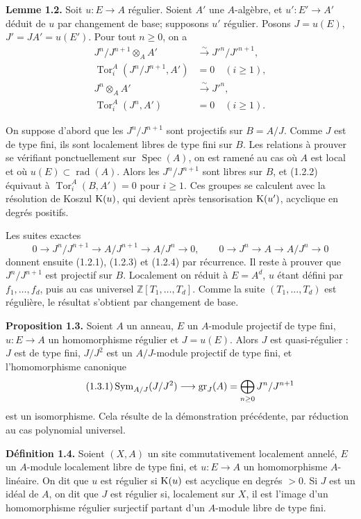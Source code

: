 \documentclass[11pt]{article}
\newcommand{\Tor}{\operatorname{Tor}}
\newcommand{\Spec}{\operatorname{Spec}}
\providecommand{\rad}{\operatorname{rad}}
\providecommand{\Tor}{\operatorname{Tor}}
\begin{document}
\textbf{Lemme 1.2.} Soit \(u:E\to A\) régulier. Soient \(A'\) une \(A\)-algèbre, et \(u':E'\to A'\) déduit de \(u\) par changement de base; supposons \(u'\) régulier. Posons \(J=u(E)\), \(J'=JA'=u(E')\). Pour tout \(n\ge0\), on a
\begin{align}
 J^n/J^{n+1}\otimes_AA'&\xrightarrow{\sim}J'^n/J'^{n+1}, \tag{1.2.1}\\
 \Tor_i^A(J^n/J^{n+1},A')&=0\quad(i\ge1), \tag{1.2.2}\\
 J^n\otimes_AA'&\xrightarrow{\sim}J'^n, \tag{1.2.3}\\
 \Tor_i^A(J^n,A')&=0\quad(i\ge1). \tag{1.2.4}
\end{align}

On suppose d'abord que les \(J^n/J^{n+1}\) sont projectifs sur \(B=A/J\). Comme \(J\) est de type fini, ils sont localement libres de type fini sur \(B\). Les relations à prouver se vérifiant ponctuellement sur \(\Spec(A)\), on est ramené au cas où \(A\) est local et où \(u(E)\subset\rad(A)\). Alors les \(J^n/J^{n+1}\) sont libres sur \(B\), et (1.2.2) équivaut à \(\Tor_i^A(B,A')=0\) pour \(i\ge1\). Ces groupes se calculent avec la résolution de Koszul \(\mathrm K(u)\), qui devient après tensorisation \(\mathrm K(u')\), acyclique en degrés positifs.

Les suites exactes
\[
0\to J^n/J^{n+1}\to A/J^{n+1}\to A/J^n\to0,
\qquad
0\to J^n\to A\to A/J^n\to0
\]
donnent ensuite (1.2.1), (1.2.3) et (1.2.4) par récurrence. Il reste à prouver que \(J^n/J^{n+1}\) est projectif sur \(B\). Localement on réduit à \(E=A^d\), \(u\) étant défini par \(f_1,\ldots,f_d\), puis au cas universel \(\mathbb Z[T_1,\ldots,T_d]\). Comme la suite \((T_1,\ldots,T_d)\) est régulière, le résultat s'obtient par changement de base.

\textbf{Proposition 1.3.} Soient \(A\) un anneau, \(E\) un \(A\)-module projectif de type fini, \(u:E\to A\) un homomorphisme régulier et \(J=u(E)\). Alors \(J\) est quasi-régulier : \(J\) est de type fini, \(J/J^2\) est un \(A/J\)-module projectif de type fini, et l'homomorphisme canonique
\begin{equation}\tag{1.3.1}
 \operatorname{Sym}_{A/J}(J/J^2)\longrightarrow \operatorname{gr}_J(A)=\bigoplus_{n\ge0}J^n/J^{n+1}
\end{equation}
est un isomorphisme. Cela résulte de la démonstration précédente, par réduction au cas polynomial universel.

\textbf{Définition 1.4.} Soient \((X,A)\) un site commutativement localement annelé, \(E\) un \(A\)-module localement libre de type fini, et \(u:E\to A\) un homomorphisme \(A\)-linéaire. On dit que \(u\) est régulier si \(\mathrm K(u)\) est acyclique en degrés \(>0\). Si \(J\) est un idéal de \(A\), on dit que \(J\) est régulier si, localement sur \(X\), il est l'image d'un homomorphisme régulier surjectif partant d'un \(A\)-module libre de type fini.
\end{document}

